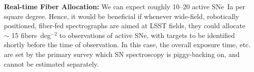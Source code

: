 {\bf Real-time Fiber Allocation:}  We can expect roughly 10--20 active SNe~Ia per square degree.  Hence, it would be beneficial if whenever wide-field, robotically positioned, fiber-fed spectrographs are aimed at LSST fields, they could allocate $\sim$ 15 fibers~deg$^{-2}$ to observations of active SNe, with targets to be identified shortly before the time of observation.  In this case, the overall exposure time, etc. are set by the primary survey which SN spectroscopy is piggy-backing on, and cannot be estimated separately.